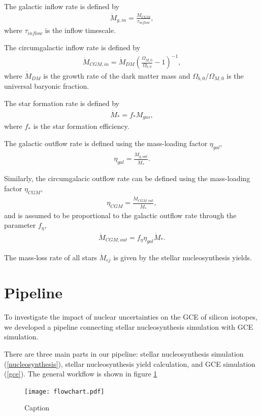 \documentclass{brandeis-thesis3.2}
\begin{document}
The galactic inflow rate is defined by 
\begin{align}
    \dot{M}_{g, in} = \frac{M_{CGM}}{\tau_{inflow}},
\end{align}
where $\tau_{inflow}$ is the inflow timescale. 

The circumgalactic inflow rate is defined by 
\begin{align}
    \dot{M}_{CGM, in} = \dot{M}_{DM} \left( \frac{\Omega_{M, 0}}{\Omega_{b, 0}} - 1\right)^{-1},
\end{align}
where $\dot{M}_{DM}$ is the growth rate of the dark matter mass and $\Omega_{b, 0}/\Omega_{M, 0}$ is the universal baryonic fraction.


The star formation rate is defined by 
\begin{align}
    \dot{M}_{*} = f_{*}M_{gas},
\end{align}
where $f_*$ is the star formation efficiency. 

The galactic outflow rate is defined using the mass-loading factor $\eta_{gal}$, 
\begin{align}
    \eta_{gal} = \frac{\dot{M}_{g, out}}{\dot{M}_{*}}.
\end{align}

Similarly, the circumgalacic outflow rate can be defined using the mass-loading factor $\eta_{CGM}$, 
\begin{align}
    \eta_{CGM} = \frac{\dot{M}_{CGM, out}}{\dot{M}_{*}},
\end{align}
and is assumed to be proportional to the galactic outflow rate through the parameter $f_{\eta}$, 
\begin{align}
    \dot{M}_{CGM, out} = f_\eta \eta_{gal} \dot{M}_{*}.
\end{align}

The mass-loss rate of all stars $\dot{M}_{ej}$ is given by the stellar nucleosynthesis yields. 


\section{Pipeline}
To investigate the impact of nuclear uncertainties on the GCE of silicon isotopes, we developed a pipeline connecting stellar nucleosynthesis simulation with GCE simulation. 

There are three main parts in our pipeline: stellar nucleosynthesis simulation (\ref{nucleosynthesis}), stellar nucleosynthesis yield calculation, and GCE simulation (\ref{gce}). The general workflow is shown in figure \ref{fig:workflow}
\begin{figure}
    \centering
    \texttt{[image: flowchart.pdf]}
    \caption{Caption}
    \label{fig:workflow}
\end{figure}
\end{document}
